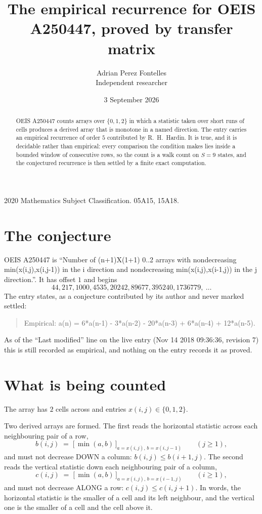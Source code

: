 \documentclass[11pt,a4paper]{article}
\title{The empirical recurrence for OEIS A250447, proved by transfer matrix}
\author{Adrian Perez Fontelles\\ \small Independent researcher}
\date{3 September 2026}
\theoremstyle{plain}
\theoremstyle{definition}
\begin{document}
\maketitle

\begin{abstract}
OEIS A250447 counts arrays over $\{0,1,2\}$ in which a statistic taken over short runs
of cells produces a derived array that is monotone in a named direction. The entry carries an
empirical recurrence of order $5$ contributed by R.~H.~Hardin. It is true, and it is
decidable rather than empirical: every comparison the condition makes lies inside a bounded
window of consecutive rows, so the count is a walk count on $S=9$ states, and the
conjectured recurrence is then settled by a finite exact computation.
\end{abstract}

\noindent\small 2020 Mathematics Subject Classification. 05A15, 15A18.\normalsize

\section{The conjecture}

OEIS A250447 is ``Number of (n+1)X(1+1) 0..2 arrays with nondecreasing min(x(i,j),x(i,j-1)) in the i direction and nondecreasing min(x(i,j),x(i-1,j)) in the j direction.''. It has offset $1$ and begins
\[
44, 217, 1000, 4535, 20242, 89677, 395240, 1736779,\ \dots
\]
The entry states, as a conjecture contributed by its author and never marked settled:
\begin{quote}
Empirical: a(n) = 6*a(n-1) - 3*a(n-2) - 20*a(n-3) + 6*a(n-4) + 12*a(n-5).
\end{quote}
As of the ``Last modified'' line on the live entry (Nov 14 2018 09:36:36, revision 7) this is still
recorded as empirical, and nothing on the entry records it as proved.

\section{What is being counted}

The array has $2$ cells across and entries $x(i,j)\in\{0,1,2\}$.

Two derived arrays are formed. The first reads the horizontal statistic across each
neighbouring pair of a row,
\[
b(i,j)\;=\;\bigl[\,\min(a,b)\,\bigr]_{a=x(i,j),\,b=x(i,j-1)}\qquad (j\ge1),
\]
and must not decrease DOWN a column: $b(i,j)\le b(i{+}1,j)$. The second reads the vertical
statistic down each neighbouring pair of a column,
\[
c(i,j)\;=\;\bigl[\,\min(a,b)\,\bigr]_{a=x(i,j),\,b=x(i{-}1,j)}\qquad (i\ge1),
\]
and must not decrease ALONG a row: $c(i,j)\le c(i,j{+}1)$. In words, the horizontal statistic
is the smaller of a cell and its left neighbour, and the vertical one is
the smaller of a cell and the cell above it.
\end{document}
